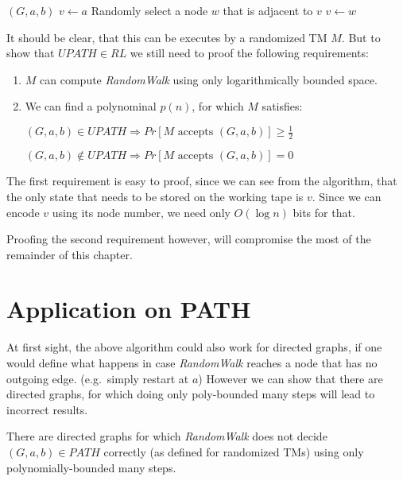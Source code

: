 \renewcommand{\algorithmicrequire}{\textbf{Input:}}
\renewcommand{\algorithmicensure}{\textbf{Output:}}

\begin{algorithmic}
\Require $(G, a, b)$
\State $v \gets a$
    \State Randomly select a node $w$ that is adjacent to $v$
    \State $v \gets w$
    \EndIf
\EndFor
{}
\end{algorithmic}

It should be clear, that this can be executes by a randomized TM $M$.
But to show that $UPATH \in RL$ we still need to proof the following
requirements:

\begin{enumerate}
\def\labelenumi{\arabic{enumi}.}
\item
  $M$ can compute \emph{RandomWalk} using only logarithmically bounded
  space.
\item
  We can find a polynominal $p(n)$, for which $M$ satisfies:

  $(G, a, b) \in UPATH \Rightarrow Pr[M \text{ accepts } (G, a, b)] \geq \frac{1}{2}$

  $(G, a, b) \not \in UPATH \Rightarrow Pr[M \text{ accepts } (G, a, b)] = 0$
\end{enumerate}

The first requirement is easy to proof, since we can see from the
algorithm, that the only state that needs to be stored on the working
tape is $v$. Since we can encode $v$ using its node number, we need only
$O(\log n)$ bits for that.

Proofing the second requirement however, will compromise the most of the
remainder of this chapter.

\section{Application on PATH}\label{application-on-path}

At first sight, the above algorithm could also work for directed graphs,
if one would define what happens in case \emph{RandomWalk} reaches a
node that has no outgoing edge. (e.g.~simply restart at $a$) However we
can show that there are directed graphs, for which doing only
poly-bounded many steps will lead to incorrect results.

\begin{thm}
\label{path-randomized-exponential}
There are directed graphs for which {\em RandomWalk} does not decide $(G, a, b) \in PATH$ correctly
(as defined for randomized TMs) using only polynomially-bounded many steps.
\end{thm}


